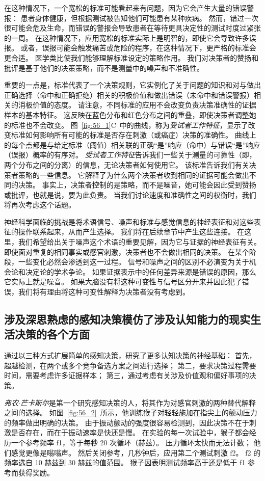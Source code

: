 在这种情况下，一个宽松的标准可能看起来有问题，因为它会产生大量的错误警报：
患者身体健康，但根据测试被告知他们可能患有某种疾病。
然而，错过一次很可能会危及生命，而错误的警报会导致患者在等待更具决定性的测试时度过紧张的一周。
在这种情况下，应用宽松的标准实际上是明智的，即使它会导致许多误报。
或者，误报可能会触发痛苦或危险的程序，在这种情况下，更严格的标准会更合适。
医学类比使我们能够理解标准设定的策略作用。
我们对决策者的赞扬和批评是基于他们的决策策略，而不是测量中的噪声和不准确性。


重要的一点是，标准代表了一个决策规则，它实例化了关于问题的知识和对与做出正确选择（命中和正确拒绝）相关的积极价值和做出错误（未命中和错误警报）相关的消极价值的态度。
请注意，不同标准的应用不会改变负责决策准确性的证据样本的基本特征。
这反映在蓝色分布和红色分布之间的重叠，即使决策者调整她的标准也不会改变。
图~\ref{fig:56_1}C~中的曲线，称为\textit{受试者工作特征}，显示了改变标准如何影响所有可能的标准是否存在刺激（或癌症）决策的准确性。
曲线上的每个点都是与给定标准（阈值）相关联的正确“是”响应（命中）与错误“是”响应（误报）概率的有序对。
\textit{受试者工作特征}告诉我们一些关于测量的可靠性（即，两个分布之间的分离）的信息，无论决策者如何使用它。
该标准告诉我们有关决策者策略的一些信息。
它解释了为什么两个决策者收到相同的证据可能会做出不同的决策。
事实上，决策者控制的是策略，而不是噪音，她可能会因此受到赞扬或批评，也就是说，要为此负责。
当我们讨论速度和准确性之间的权衡时，我们将再次考虑这个话题。


神经科学面临的挑战是将术语信号、噪声和标准与感觉信息的神经表征和对这些表征的操作联系起来，从而产生选择。
我们将在后续章节中产生这些连接。
在这里，我们希望给出关于噪声这个术语的重要见解，因为它与证据的神经表征有关。
即使面对重复的相同事实或感官刺激，决策者也不会做出相同的决策。
在某个阶段，一些变化必然会渗透到这一过程。
信号和噪声之间的区别不必演变为关于机会论和决定论的学术争论。
如果证据表示中的任何差异来源是错误的原因，那么它实际上就是噪音。
如果大脑没有将这种可变性与信号区分开来并因此犯了错误，我们将有理由将这种可变性解释为决策者没有考虑到。


\subsection{涉及深思熟虑的感知决策模仿了涉及认知能力的现实生活决策的各个方面}

通过以三种方式扩展简单的感知决策，研究了更多认知决策的神经基础：
首先，超越检测，在两个或多个竞争备选方案之间进行选择；
第二，要求决策过程需要时间，需要考虑许多证据样本；
第三，通过考虑有关涉及价值观和偏好事项的决策。


\textit{弗农$\cdot$芒卡斯尔}是第一个研究感知决策的人，将其作为对感官刺激的两种替代解释之间的选择。
如图~\ref{fig:56_2}~所示，他训练猴子对轻轻施加在指尖上的颤动压力的频率做出明确的决策。
由于振动颤动的强度很容易检测到，因此决策不在于刺激是否存在，而在于振动速率是快还是慢。
在实验的每一次试验中，猴子都会经历一个参考频率 f1，等于每秒 20 次循环（赫兹）。
压力循环太快而无法计数；
他们感觉更像是嗡嗡声。
然后关闭参考，几秒钟后，应用第二个测试刺激 f2。
f2 的频率选自 10 赫兹到 30 赫兹的值范围。
猴子因表明测试频率高于还是低于 f1 参考而获得奖励。


